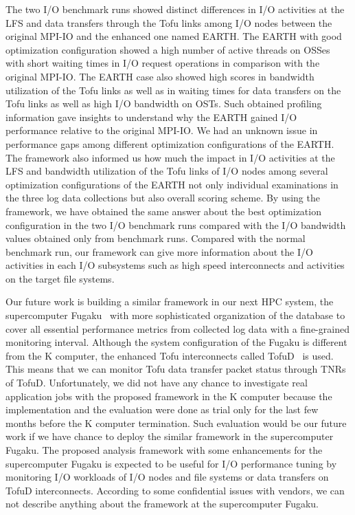 \documentclass{jhps}
\begin{document}
The two I/O benchmark runs showed distinct differences in I/O activities at the LFS
and data transfers through the Tofu links among I/O nodes between the original MPI-IO
and the enhanced one named EARTH.
The EARTH with good optimization configuration showed a high number of active threads
on OSSes with short waiting times in I/O request operations in comparison
with the original MPI-IO. The EARTH case also showed high scores in bandwidth utilization
of the Tofu links as well as in waiting times for data transfers on the Tofu links
as well as high I/O bandwidth on OSTs.
Such obtained profiling information gave insights to understand
why the EARTH gained I/O performance relative to the original MPI-IO.
We had an unknown issue in performance gaps among different optimization configurations
of the EARTH.
The framework also informed us how much the impact in I/O activities at the LFS
and bandwidth utilization of the Tofu links of I/O nodes
among several optimization configurations of the EARTH
not only individual examinations in the three log data collections
but also overall scoring scheme.
By using the framework, we have obtained the same answer about the best
optimization configuration in the two I/O benchmark runs compared with
the I/O bandwidth values obtained only from benchmark runs.
Compared with the normal benchmark run, our framework can give
more information about the I/O activities in each I/O subsystems
such as high speed interconnects and activities on the target
file systems.

Our future work is building a similar framework in our next HPC system,
the supercomputer Fugaku~\cite{fugaku_info:web} with more sophisticated organization
of the database to cover all essential performance metrics
from collected log data with a fine-grained monitoring interval.
Although the system configuration of the Fugaku is different from the K computer,
the enhanced Tofu interconnects called TofuD~\cite{tofuD:cluster2018}
is used.
This means that we can monitor Tofu data transfer packet status
through TNRs of TofuD.
Unfortunately, we did not have any chance to investigate real application jobs
with the proposed framework in the K computer because the implementation
and the evaluation were done as trial only for the last few months
before the K computer termination.
Such evaluation would be our future work if we have chance to deploy
the similar framework in the supercomputer Fugaku.
The proposed analysis framework with some enhancements for the supercomputer Fugaku
is expected to be useful for I/O performance tuning by monitoring I/O workloads
of I/O nodes and file systems or data transfers on TofuD interconnects.
According to some confidential issues with vendors,
we can not describe anything about the framework at the supercomputer Fugaku.
\end{document}
